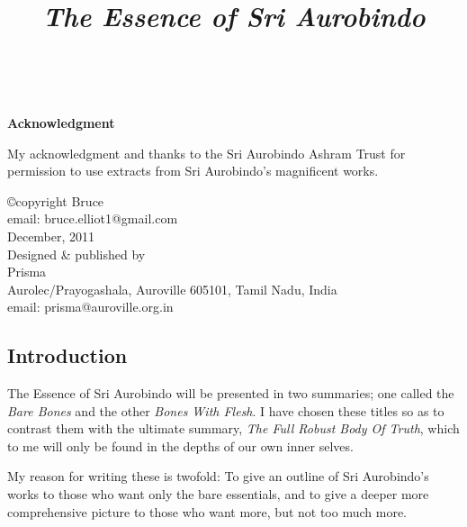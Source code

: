 \documentclass[12pt,a4paper]{book}
\title{%
  {\emph{The Essence of Sri Aurobindo}}}
\date{}
\begin{document}

\thispagestyle{empty}
\maketitle


\
\vspace{2cm}
\begin{center}{\bf Acknowledgment}\end{center}
\thispagestyle{empty}

My acknowledgment and thanks to the Sri Aurobindo Ashram Trust for
permission to use extracts from Sri Aurobindo's magnificent works.

\vspace{1.5cm}

\begin{center}
\copyright copyright Bruce\\
email: bruce.elliot1@gmail.com\\
December, 2011\\
\vspace{1cm}
Designed \& published by\\
Prisma\\
Aurolec/Prayogashala, Auroville 605101, Tamil Nadu, India\\
email: prisma@auroville.org.in\\
\end{center}
\newpage

\pagestyle{plain}
\begin{center}\section*{Introduction}\end{center}

The Essence of Sri Aurobindo will be presented in two summaries; one
called the \emph{Bare Bones} and the other \emph{Bones With Flesh}. I
have chosen these titles so as to contrast them with the ultimate
summary, \emph{The Full Robust Body Of Truth}, which to me will only
be found in the depths of our own inner selves.

My reason for writing these is twofold: To give an outline of Sri
Aurobindo's works to those who want only the bare essentials, and to
give a deeper more comprehensive picture to those who want more, but
not too much more.
\end{document}
